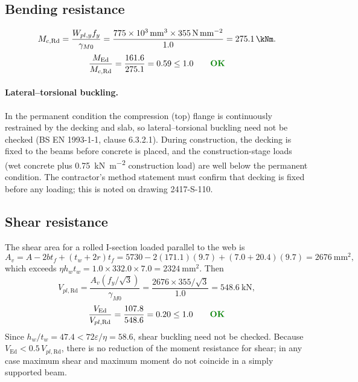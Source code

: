 \documentclass[11pt,a4paper]{article}
\newcommand{\pass}{\textcolor{green!50!black}{\textbf{OK}}}
\begin{document}
\subsection{Bending resistance}

\begin{equation}
  M_{c,\text{Rd}} = \frac{W_{pl,y} f_y}{\gamma_{M0}} = \frac{\qty{775e3}{\milli\metre\cubed} \times \qty{355}{\newton\per\milli\metre\squared}}{1.0} = \qty{275.1}{\kNm}.
\end{equation}
\[
  \frac{M_{\text{Ed}}}{M_{c,\text{Rd}}} = \frac{161.6}{275.1} = 0.59 \le 1.0 \qquad \pass
\]

\paragraph{Lateral--torsional buckling.} In the permanent condition the compression (top) flange is continuously restrained by the decking and slab, so lateral--torsional buckling need not be checked (BS EN 1993-1-1, clause 6.3.2.1). During construction, the decking is fixed to the beams before concrete is placed, and the construction-stage loads (wet concrete plus \qty{0.75}{\kN\per\metre\squared} construction load) are well below the permanent condition. The contractor's method statement must confirm that decking is fixed before any loading; this is noted on drawing 2417-S-110.

\subsection{Shear resistance}

The shear area for a rolled I-section loaded parallel to the web is
\begin{equation}
  A_v = A - 2bt_f + (t_w + 2r)t_f = 5730 - 2(171.1)(9.7) + (7.0 + 20.4)(9.7) = \qty{2676}{\milli\metre\squared},
\end{equation}
which exceeds $\eta h_w t_w = 1.0 \times 332.0 \times 7.0 = \qty{2324}{\milli\metre\squared}$. Then
\begin{equation}
  V_{pl,\text{Rd}} = \frac{A_v (f_y/\sqrt{3})}{\gamma_{M0}} = \frac{2676 \times 355/\sqrt{3}}{1.0} = \qty{548.6}{\kN},
\end{equation}
\[
  \frac{V_{\text{Ed}}}{V_{pl,\text{Rd}}} = \frac{107.8}{548.6} = 0.20 \le 1.0 \qquad \pass
\]
Since $h_w/t_w = 47.4 < 72\varepsilon/\eta = 58.6$, shear buckling need not be checked. Because $V_{\text{Ed}} < 0.5\,V_{pl,\text{Rd}}$, there is no reduction of the moment resistance for shear; in any case maximum shear and maximum moment do not coincide in a simply supported beam.
\end{document}
